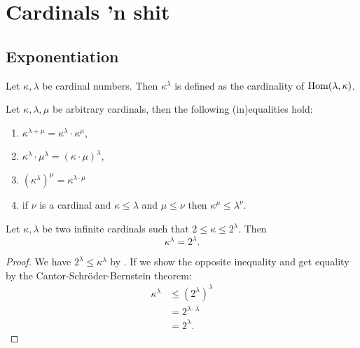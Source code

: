 \section{Cardinals 'n shit}
\subsection{Exponentiation}
\begin{definition}
    Let \(\kappa,\lambda\) be cardinal numbers. Then \(\kappa^{\lambda}\) is
    defined as the cardinality of \(\operatorname{Hom}(\lambda,\kappa)\).
\end{definition}

\begin{theorem}
    \label{thm:basic-exp}
    Let \(\kappa,\lambda,\mu\) be arbitrary cardinals, then the following
    (in)equalities hold:
    \begin{enumerate}
        \item \(\kappa^{\lambda+\mu}=\kappa^{\lambda}\cdot\kappa^{\mu}\),
        \item \(\kappa^{\lambda}\cdot\mu^{\lambda}=(\kappa\cdot\mu)^{\lambda}\),
        \item \((\kappa^{\lambda})^{\mu}=\kappa^{\lambda\cdot\mu}\)
        \item if \(\nu\) is a cardinal and \(\kappa\leq\lambda\) and
              \(\mu\leq\nu\) then \(\kappa^{\mu}\leq\lambda^{\nu}\).
    \end{enumerate}
\end{theorem}

\begin{proposition}
    \label{thm:exp-smaller}
    Let \(\kappa,\lambda\) be two infinite cardinals such that
    \(2\leq\kappa\leq 2^{\lambda}\). Then
    \[
        \kappa^{\lambda}=2^{\lambda}.
    \]

    \begin{proof}
        We have \(2^{\lambda}\leq\kappa^{\lambda}\) by . If
        we show the opposite inequality and get equality by the
        Cantor-Schröder-Bernstein theorem:
        \begin{align*}
            \kappa^{\lambda} & \leq (2^{\lambda})^{\lambda} \\
                             & =2^{\lambda\cdot\lambda}     \\
                             & =2^{\lambda}.
        \end{align*}
    \end{proof}
\end{proposition}

